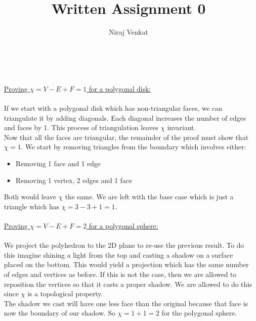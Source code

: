 \documentclass{article}
\begin{document}
\title{Written Assignment 0}

\author{Niraj Venkat}

\date{}

\maketitle

\vspace{.8cm}
\\\\
\underline{Proving $\chi = V - E + F = 1$ for a polygonal disk:}
\\\\
If we start with a polygonal disk which has non-triangular faces, we can triangulate it by adding diagonals.
Each diagonal increases the number of edges and faces by 1. This process of triangulation leaves $\chi$ invariant.
\\
Now that all the faces are triangular, the remainder of the proof must show that $\chi = 1$. 
We start by removing triangles from the boundary which involves either:
\begin{itemize}
    \item Removing 1 face and 1 edge
    \item Removing 1 vertex, 2 edges and 1 face
\end{itemize}
Both would leave $\chi$ the same.
We are left with the base case which is just a triangle which has $\chi = 3 - 3 + 1 = 1$. 
\\\\
\underline{Proving $\chi = V - E + F = 2$ for a polygonal sphere:}
\\\\
We project the polyhedron to the 2D plane to re-use the previous result. To do this imagine shining a light from the top and casting a shadow 
on a surface placed on the bottom. This would yield a projection which has the same number of edges and vertices as before. 
If this is not the case, then we are allowed to reposition the vertices so that it casts a proper shadow. 
We are allowed to do this since $\chi$ is a topological property.
\\
The shadow we cast will have one less face than the original because that face is now the boundary of our shadow.
So $\chi = 1 + 1 = 2$ for the polygonal sphere.
\end{document}
